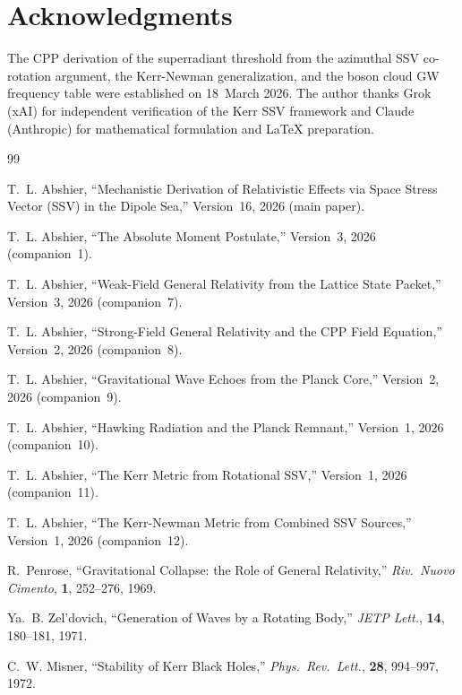 \documentclass[12pt]{article}
\begin{document}
\section*{Acknowledgments}

The CPP derivation of the superradiant threshold from the azimuthal SSV
co-rotation argument, the Kerr-Newman generalization, and the boson
cloud GW frequency table were established on 18~March 2026.
The author thanks Grok (xAI) for independent verification of the Kerr
SSV framework and Claude (Anthropic) for mathematical formulation and
LaTeX preparation.

\begin{thebibliography}{99}

T.~L. Abshier,
``Mechanistic Derivation of Relativistic Effects via Space Stress
Vector (SSV) in the Dipole Sea,''
Version~16, 2026 (main paper).

T.~L. Abshier,
``The Absolute Moment Postulate,''
Version~3, 2026 (companion~1).

T.~L. Abshier,
``Weak-Field General Relativity from the Lattice State Packet,''
Version~3, 2026 (companion~7).

T.~L. Abshier,
``Strong-Field General Relativity and the CPP Field Equation,''
Version~2, 2026 (companion~8).

T.~L. Abshier,
``Gravitational Wave Echoes from the Planck Core,''
Version~2, 2026 (companion~9).

T.~L. Abshier,
``Hawking Radiation and the Planck Remnant,''
Version~1, 2026 (companion~10).

T.~L. Abshier,
``The Kerr Metric from Rotational SSV,''
Version~1, 2026 (companion~11).

T.~L. Abshier,
``The Kerr-Newman Metric from Combined SSV Sources,''
Version~1, 2026 (companion~12).

R.~Penrose,
``Gravitational Collapse: the Role of General Relativity,''
\textit{Riv.\ Nuovo Cimento}, \textbf{1}, 252--276, 1969.

Ya.~B. Zel'dovich,
``Generation of Waves by a Rotating Body,''
\textit{JETP Lett.}, \textbf{14}, 180--181, 1971.

C.~W. Misner,
``Stability of Kerr Black Holes,''
\textit{Phys.\ Rev.\ Lett.}, \textbf{28}, 994--997, 1972.


\end{thebibliography}
\end{document}
